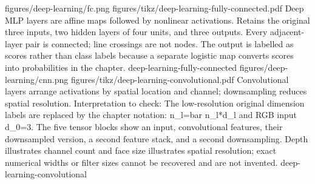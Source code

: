 {figures/deep-learning/fc.png}
{figures/tikz/deep-learning-fully-connected.pdf}
{Deep MLP layers are affine maps followed by nonlinear activations.}
{Retains the original three inputs, two hidden layers of four units, and three outputs. Every adjacent-layer pair is connected; line crossings are not nodes. The output is labelled as scores rather than class labels because a separate logistic map converts scores into probabilities in the chapter.}
{deep-learning-fully-connected}
{figures/deep-learning/cnn.png}
{figures/tikz/deep-learning-convolutional.pdf}
{Convolutional layers arrange activations by spatial location and channel; downsampling reduces spatial resolution.}
{Interpretation to check: The low-resolution original dimension labels are replaced by the chapter notation: n\_l=bar n\_l*d\_l and RGB input d\_0=3. The five tensor blocks show an input, convolutional features, their downsampled version, a second feature stack, and a second downsampling. Depth illustrates channel count and face size illustrates spatial resolution; exact numerical widths or filter sizes cannot be recovered and are not invented.}
{deep-learning-convolutional}
